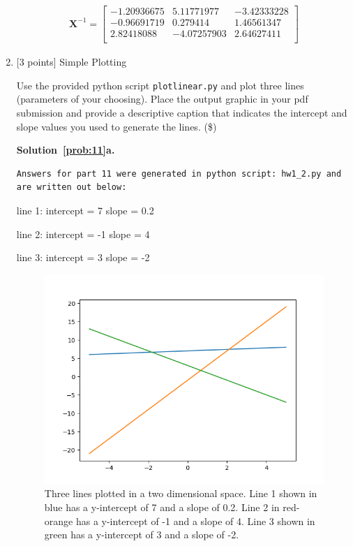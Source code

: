 \documentclass[10pt]{article}
\begin{document}
\begin{enumerate}
\begin{eqnarray*}
\mathbf{X}^{-1} =
    \begin{bmatrix}
    -1.20936675 & 5.11771977 & -3.42333228 \\[0.3em]
    -0.96691719 & 0.279414   & 1.46561347 \\[0.3em]
    2.82418088 & -4.07257903 & 2.64627411 \\[0.3em]
    \end{bmatrix}
\end{eqnarray*}

\pagebreak

\item \label{prob:11} [3 points] Simple Plotting

Use the provided python script {\tt plotlinear.py} and plot three lines (parameters of your choosing).  Place the output graphic in your pdf submission and provide a descriptive caption that indicates the intercept and slope values you used to generate the lines. (\$)

{\bf Solution~\ref{prob:11}a.} 

\begin{verbatim}
Answers for part 11 were generated in python script: hw1_2.py and are written out below:
\end{verbatim}

line 1:
intercept = 7 
slope = 0.2

line 2:
intercept = -1
slope = 4

line 3:
intercept = 3 
slope = -2


\begin{figure}[H]
  \includegraphics[width=\linewidth]{exercise11.png}
  \caption{Three lines plotted in a two dimensional space. Line 1 shown in blue has a y-intercept of 7 and a slope of 0.2. Line 2 in red-orange has a y-intercept of -1 and a slope of 4. Line 3 shown in green has a y-intercept of 3 and a slope of -2. }
  \label{fig:exercise11}
\end{figure}





\end{enumerate}
\end{document}
